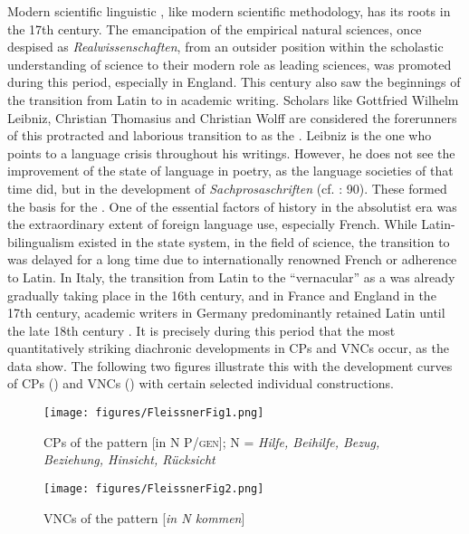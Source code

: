 \documentclass[output=paper,colorlinks,citecolor=brown]{langscibook}
\begin{document}
Modern scientific linguistic , like modern scientific methodology, has its roots in the 17th century. The emancipation of the empirical natural sciences, once despised as \textit{Realwissenschaften}, from an outsider position within the scholastic understanding of science to their modern role as leading sciences, was promoted during this period, especially in England. This century also saw the beginnings of the transition from Latin to  in academic writing. Scholars like Gottfried Wilhelm Leibniz, Christian Thomasius and Christian Wolff are considered the forerunners of this protracted and laborious transition to  as the . Leibniz is the one who points to a language crisis throughout his writings. However, he does not see the improvement of the state of language in poetry, as the language societies of that time did, but in the development of \textit{Sachprosaschriften} (cf. \citealt{Pörksen1984}: 90). These formed the basis for the  . One of the essential factors of  history in the absolutist era was the extraordinary extent of foreign language use, especially French. While Latin- bilingualism existed in the state system, in the field of science, the transition to  was delayed for a long time due to internationally renowned French or adherence to Latin. In Italy, the transition from Latin to the ``vernacular'' as a  was already gradually taking place in the 16th century, and in France and England in the 17th century, academic writers in Germany predominantly retained Latin until the late 18th century \citep[cf.][53--58]{Polenz2013}. It is precisely during this period that the most quantitatively striking diachronic developments in CPs and VNCs occur, as the data show. The following two figures illustrate this with the development curves of CPs () and VNCs () with certain selected individual constructions.

\begin{figure}
\caption{CPs of the pattern [in \textup{N P/}\textsc{gen}]; N = \textit{Hilfe, Beihilfe, Bezug, Beziehung, Hinsicht, Rücksicht}}\label{fig:fleissner:1}
\texttt{[image: figures/FleissnerFig1.png]}
\end{figure}

\begin{figure}
\caption{VNCs of the pattern [\textit{in N kommen}]}
\texttt{[image: figures/FleissnerFig2.png]}
\label{fig:fleissner:2}
\end{figure}
\end{document}
